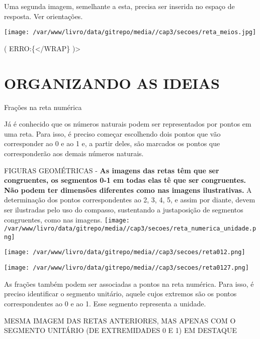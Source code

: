 \documentclass[a4,12pt]{book}
\begin{document}
Uma segunda imagem, semelhante a esta, precisa ser inserida no espaço de resposta. Ver orientações.

\texttt{[image: /var/www/livro/data/gitrepo/media//cap3/secoes/reta\_meios.jpg]}

( ERRO:\{</WRAP\} )>



\section{ORGANIZANDO AS IDEIAS }


Frações na reta numérica \mbox{} \newline 


Já é conhecido que os números naturais podem ser representados por pontos em uma reta. 
Para isso, é preciso começar escolhendo dois pontos que vão corresponder ao 0 e ao 1 e, a partir deles, são marcados os pontos que corresponderão aos demais números naturais.

\begin{imagem*}[breakable]{}{}   FIGURAS GEOMÉTRICAS -   {\bf As imagens das retas têm que ser congruentes, os segmentos 0-1 em todas elas tê que ser congruentes. Não podem ter dimensões diferentes como nas imagens ilustrativas. }     \mbox{} \newline   
  A determinação dos pontos correspondentes ao  2, 3, 4, 5, e assim por diante, devem ser ilustradas pelo uso do compasso, sustentando a justaposição de segmentos congruentes, como nas imagens.   
    \texttt{[image: /var/www/livro/data/gitrepo/media//cap3/secoes/reta\_numerica\_unidade.png]}    \end{imagem*}
\begin{imagem*}[breakable]{}{}       \texttt{[image: /var/www/livro/data/gitrepo/media//cap3/secoes/reta012.png]}    \end{imagem*}
\begin{imagem*}[breakable]{}{}       \texttt{[image: /var/www/livro/data/gitrepo/media//cap3/secoes/reta0127.png]}   \end{imagem*}

As frações também podem ser associadas a pontos na reta numérica. Para isso, é preciso identificar o segmento unitário, aquele cujos extremos são os pontos correspondentes ao 0 e ao 1. Esse segmento representa a unidade.

\begin{imagem*}[breakable]{}{}   MESMA IMAGEM DAS RETAS ANTERIORES, MAS APENAS COM O SEGMENTO UNITÁRIO (DE EXTREMIDADES 0 E 1) EM DESTAQUE  \end{imagem*}
\end{document}
